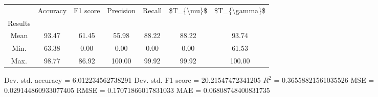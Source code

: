 \begin{tabular}{|c|c|c|c|c|c|c|}
\toprule
{} &  Accuracy &  F1 score &  Precision &  Recall &  \$T\_\{\textbackslash mu\}\$ &  \$T\_\{\textbackslash gamma\}\$ \\
Results &           &           &            &         &            &               \\
\hline
Mean    &     93.47 &     61.45 &      55.98 &   88.22 &      88.22 &         93.74 \\
Min.    &     63.38 &      0.00 &       0.00 &    0.00 &       0.00 &         61.53 \\
Max.    &     98.77 &     86.92 &     100.00 &   99.92 &      99.92 &        100.00 \\
\bottomrule
\end{tabular}

 Dev. std. accuracy = 6.012234562738291
 Dev. std. F1-score = 20.21547472341205
 $R^2$ = 0.36558821561035526
 MSE = 0.029144860933077405
 RMSE = 0.17071866017831033
 MAE = 0.06808748400831735
